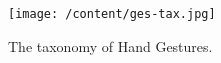 \begin{figure}
	[h] \centering 
	\texttt{[image: /content/ges-tax.jpg]} \caption{The taxonomy of Hand Gestures. \cite{2}} \label{fg:ges:tax} 
\end{figure}
